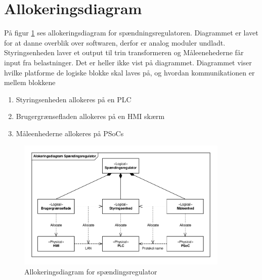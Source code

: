 
\section{Allokeringsdiagram}
På figur \ref{fig:Allokering} ses allokeringsdiagram for spændningsregulatoren. Diagrammet er lavet for at danne overblik over softwaren, derfor er analog moduler undladt. Styringsenheden laver et output til trin transformeren og Måleenehederne får input fra belastninger. Det er heller ikke vist på diagrammet. Diagrammet viser hvilke platforme de logiske blokke skal laves på, og hvordan kommunikationen er mellem blokkene

\begin{enumerate}
	\item Styringsenheden allokeres på en PLC
	\item Brugergrænsefladen allokeres på en HMI skærm
	\item Måleenhederne allokeres på PSoCs
\end{enumerate}   

\begin{figure}[htbp] %
	\centering
	\includegraphics[width=0.9\textwidth]{Figure/Allokering}
	\caption{Allokeringsdiagram for spændingsregulator}
	\label{fig:Allokering}
\end{figure}

\newpage